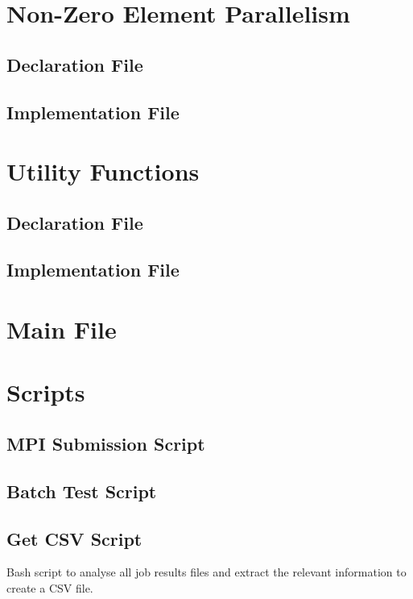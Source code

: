 \documentclass[12pt,oneside]{book} %
\begin{document}
\begin{subappendices}
    \section{Non-Zero Element Parallelism}\label{appendix:non-zero}
    \subsection{Declaration File}
    
    \subsection{Implementation File}
    

    \section{Utility Functions}\label{appendix:utility}
    \subsection{Declaration File}
    
    \subsection{Implementation File}
    

    \section{Main File}\label{appendix:main}
    

    \section{Scripts}\label{appendix:scripts}
    \subsection{MPI Submission Script}
    

    \newpage
    \subsection{Batch Test Script}
    

    \newpage
    \subsection{Get CSV Script}
    Bash script to analyse all job results files and extract the relevant information to create a CSV file.
    
    

\end{subappendices}
\end{document}
